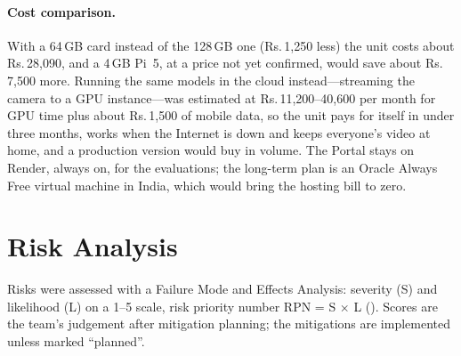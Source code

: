 \paragraph{Cost comparison.} With a 64\,GB card instead of the 128\,GB one (Rs.\,1,250 less) the unit costs about Rs.\,28,090, and a 4\,GB Pi~5, at a price not yet confirmed, would save about Rs.\,7,500 more. Running the same models in the cloud instead---streaming the camera to a GPU instance---was estimated at Rs.\,11,200--40,600 per month for GPU time plus about Rs.\,1,500 of mobile data, so the unit pays for itself in under three months, works when the Internet is down and keeps everyone's video at home, and a production version would buy in volume. The Portal stays on Render, always on, for the evaluations; the long-term plan is an Oracle Always Free virtual machine in India, which would bring the hosting bill to zero.

\section{Risk Analysis}
\label{sec:risk}
Risks were assessed with a Failure Mode and Effects Analysis: severity (S) and likelihood (L) on a 1--5 scale, risk priority number RPN = S $\times$ L (). Scores are the team's judgement after mitigation planning; the mitigations are implemented unless marked ``planned''.

